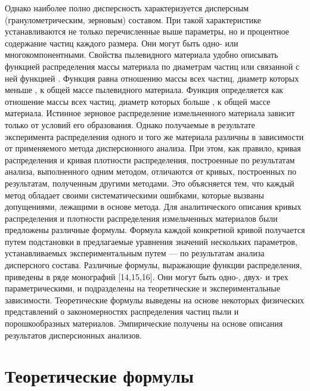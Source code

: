 Однако наиболее полно дисперсность характеризуется дисперсным (гранулометрическим, зерновым) составом. При такой характеристике устанавливаются не только перечисленные выше параметры, но и процентное содержание частиц каждого размера. 
Они могут быть одно- или многокомпонентными. Свойства пылевидного материала удобно описывать функцией распределения  массы материала по диаметрам частиц или связанной с ней функцией  .
Функция  равна отношению массы всех частиц, диаметр которых меньше  , к общей массе пылевидного материала. Функция   определяется как отношение массы всех частиц, диаметр которых больше  , к общей массе материала.
Истинное зерновое распределение измельченного материала зависит только от условий его образования. Однако получаемые в результате эксперимента распределения одного и того же материала различны в зависимости от применяемого метода дисперсионного анализа. При этом, как правило, кривая распределения и кривая плотности распределения, построенные по результатам анализа, выполненного одним методом, отличаются от кривых, построенных по результатам, полученным другими методами. Это объясняется тем, что каждый метод обладает своими систематическими ошибками, которые вызваны допущениями, лежащими в основе метода.
Для аналитического описания кривых распределения и плотности распределения измельченных материалов были предложены различные формулы. Формула каждой конкретной кривой получается путем подстановки в предлагаемые уравнения значений нескольких параметров, устанавливаемых экспериментальным путем — по результатам анализа дисперсного состава. 
Различные формулы, выражающие функции распределения, приведены в ряде монографий [14,15,16]. Они могут быть одно-, двух- и трех параметрическими, и подразделены на теоретические и экспериментальные зависимости. 
Теоретические формулы выведены на основе некоторых физических представлений о закономерностях распределения частиц пыли и порошкообразных материалов. Эмпирические получены на основе описания результатов дисперсионных анализов. 

\section{Теоретические формулы } \label{sect1_3}

